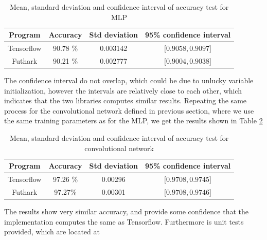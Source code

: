 \begin{table}[!htbp]
	\centering
	\begin{tabular}{|c|c|c| c|} \hline
		\textbf{Program} & \textbf{Accuracy} & \textbf{Std deviation} & \textbf{95\%
			confidence interval} \\ \hline \hline 
		Tensorflow & 90.78 \% & 0.003142 & $\lbrack 0.9058, 0.9097 \rbrack$ \\ \hline
		Futhark & 90.21 \% & 0.002777   &  $\lbrack 0.9004, 0.9038 \rbrack$ \\ \hline
	\end{tabular}
	\caption{Mean, standard deviation and confidence interval of accuracy test for
		MLP}
	\label{acc_mlp}
\end{table}\newline   
The confidence interval do not overlap, which could be due to unlucky variable
initialization, however the intervals are relatively close to each other, which
indicates that the two libraries computes similar results. Repeating the same
process for the convolutional network defined in previous section, where we use
the same training parameters as for the MLP, we get the results shown in Table
\ref{table:conv}
\begin{table}[!htbp]
	\centering
	\begin{tabular}{|c|c|c| c|} \hline
		\textbf{Program} & \textbf{Accuracy} & \textbf{Std deviation} & \textbf{95\%
			confidence interval} \\ \hline \hline 
		Tensorflow & 97.26 \% & 0.00296 & $\lbrack 0.9708, 0.9745 \rbrack$ \\ \hline
		Futhark & 97.27\% & 0.00301   &  $\lbrack 0.9708, 0.9746 \rbrack$ \\ \hline
	\end{tabular}
	\caption{Mean, standard deviation and confidence interval of accuracy test for
		convolutional network}
	\label{table:conv}
\end{table}\newline 
The results show very similar accuracy, and provide some confidence that the
implementation computes the same as Tensorflow.  
Furthermore is unit tests provided, which are located at 

